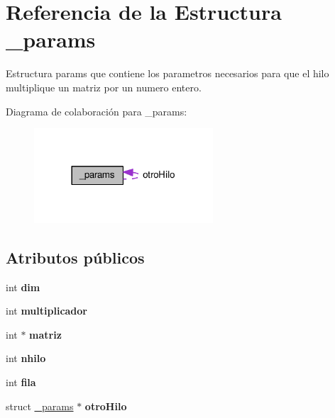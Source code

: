 \hypertarget{struct__params}{}\section{Referencia de la Estructura \+\_\+params}
\label{struct__params}


Estructura params que contiene los parametros necesarios para que el hilo multiplique un matriz por un numero entero.  




Diagrama de colaboración para \+\_\+params\+:\nopagebreak
\begin{figure}[H]
\begin{center}
\leavevmode
\includegraphics[width=189pt]{struct__params__coll__graph}
\end{center}
\end{figure}
\subsection*{Atributos públicos}
\begin{DoxyCompactItemize}
\item 
int {\bfseries dim}\hypertarget{struct__params_aecffef63bfeb1c33b37bd5df12a98401}{}\label{struct__params_aecffef63bfeb1c33b37bd5df12a98401}

\item 
int {\bfseries multiplicador}\hypertarget{struct__params_a142e538b8c88b8748ad390b6a86fe17d}{}\label{struct__params_a142e538b8c88b8748ad390b6a86fe17d}

\item 
int $\ast$ {\bfseries matriz}\hypertarget{struct__params_a04b3f21e1f7c21b17a510c2a4ee0e552}{}\label{struct__params_a04b3f21e1f7c21b17a510c2a4ee0e552}

\item 
int {\bfseries nhilo}\hypertarget{struct__params_a160a4d501715e51cfa0a2f289b6c5b14}{}\label{struct__params_a160a4d501715e51cfa0a2f289b6c5b14}

\item 
int {\bfseries fila}\hypertarget{struct__params_a8ebf07d62261f18feb39cad26d027616}{}\label{struct__params_a8ebf07d62261f18feb39cad26d027616}

\item 
struct \hyperlink{struct__params}{\+\_\+params} $\ast$ {\bfseries otro\+Hilo}\hypertarget{struct__params_a21ba0961d6fcfa8c876ba58142d181be}{}\label{struct__params_a21ba0961d6fcfa8c876ba58142d181be}

\end{DoxyCompactItemize}


